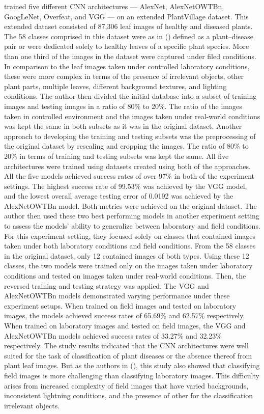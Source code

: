 \documentclass{BachelorBUI}
\begin{document}
\textcite{Ferentinos:2018} trained five different CNN architectures --- AlexNet, AlexNetOWTBn, GoogLeNet, Overfeat, and VGG --- on an extended PlantVillage dataset. This extended dataset consisted of 87,306 leaf images of healthy and diseased plants. The 58 classes comprised in this dataset were as in (\cite{Mohanty:2016}) defined as a plant--disease pair or were dedicated solely to healthy leaves of a specific plant species. More than one third of the images in the dataset were captured under filed conditions. In comparison to the leaf images taken under controlled laboratory conditions, these were more complex in terms of the presence of irrelevant objects, other plant parts, multiple leaves, different background textures, and lighting conditions. The author then divided the initial database into a subset of training images and testing images in a ratio of 80\% to 20\%. The ratio of the images taken in controlled environment and the images taken under real-world conditions was kept the same in both subsets as it was in the original dataset. Another approach to developing the training and testing subsets was the preprocessing of the original dataset by rescaling and cropping the images. The ratio of 80\% to 20\% in terms of training and testing subsets was kept the same. All five architectures were trained using datasets created using both of the approaches. All the five models achieved success rates of over 97\% in both of the experiment settings. The highest success rate of 99.53\% was achieved by the VGG model, and the lowest overall average testing error of 0.0192 was achieved by the AlexNetOWTBn model. Both metrics were achieved on the original dataset. The author then used these two best performing models in another experiment setting to assess the models' ability to generalize between laboratory and field conditions. For this experiment setting, they focused solely on classes that contained images taken under both laboratory conditions and field conditions. From the 58 classes in the original dataset, only 12 contained images of both types. Using these 12 classes, the two models were trained only on the images taken under laboratory conditions and tested on images taken under real-world conditions. Then, the reversed training and testing strategy was applied. The VGG and AlexNetOWTBn models demonstrated varying performance under these experiment setups. When trained on field images and tested on laboratory images, the models achieved success rates of 65.69\% and 62.57\% respectively. When trained on laboratory images and tested on field images, the VGG and AlexNetOWTBn models achieved success rates of 33.27\% and 32.23\% respectively. The study results indicated that the CNN architectures were well suited for the task of classification of plant diseases or the absence thereof from plant leaf images. But as the authors in (\cite{Mohanty:2016}), this study also showed that classifying field images is more challenging than classifying laboratory images. This difficulty arises from increased complexity of field images that have varied backgrounds, inconsistent lightning conditions, and the presence of other for the classification irrelevant objects.
\end{document}
